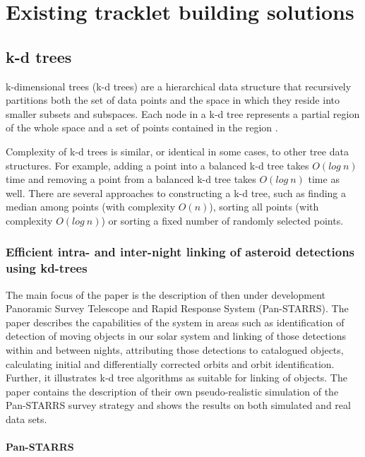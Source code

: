 \chapter{Existing tracklet building solutions}\label{chap:existing_solutions}

\section{k-d trees}\label{sec:kd_trees}
	
	k-dimensional trees (k-d trees) are a hierarchical data structure that recursively partitions both the set of data points and the space in which they reside into smaller subsets and subspaces. Each node in a k-d tree represents a partial region of the whole space and a set of points contained in the region \citep{Bentley:1975:MBS:361002.361007}.
	
	Complexity of k-d trees is similar, or identical in some cases, to other tree data structures. For example, adding a point into a balanced k-d tree takes $O(log\ n)$ time and removing a point from a balanced k-d tree takes $O(log\ n)$ time as well. There are several approaches to constructing a k-d tree, such as finding a median among points (with complexity $O(n)$), sorting all points (with complexity $O(log\ n)$) or sorting a fixed number of randomly selected points.

\subsection{Efficient intra- and inter-night linking of asteroid detections using kd-trees}\label{subsec:intra_inter}

	The main focus of the paper is the description of then under development Panoramic Survey Telescope and Rapid Response System (Pan-STARRS). The paper describes the capabilities of the system in areas such as identification of detection of moving objects in our solar system and linking of those detections within and between nights, attributing those detections to catalogued objects, calculating initial and differentially corrected orbits and orbit identification. Further, it illustrates k-d tree algorithms as suitable for linking of objects. The paper contains the description of their own pseudo-realistic simulation of the Pan-STARRS survey strategy and shows the results on both simulated and real data sets.
	
\subsubsection{Pan-STARRS}
	
